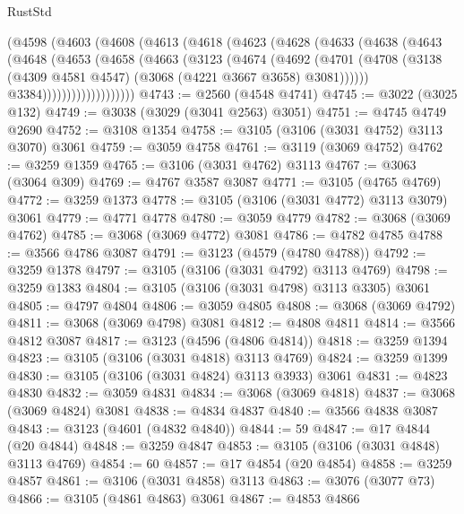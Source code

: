 \begin{lexlean}{RustStd}
\begin{coremodule}
            (@4598
              (@4603
                (@4608
                  (@4613
                    (@4618
                      (@4623
                        (@4628
                          (@4633
                            (@4638
                              (@4643
                                (@4648
                                  (@4653
                                    (@4658
                                      (@4663
                                        (@3123
                                          (@4674
                                            (@4692
                                              (@4701
                                                (@4708
                                                  (@3138
                                                    (@4309 @4581 @4547)
                                                    (@3068 (@4221 @3667 @3658) @3081))))))
                                          @3384)))))))))))))))))))
@4743 := @2560 (@4548 @4741)
@4745 := @3022 (@3025 @132)
@4749 := @3038 (@3029 (@3041 @2563) @3051)
@4751 := @4745 @4749 @2690
@4752 := @3108 @1354
@4758 := @3105 (@3106 (@3031 @4752) @3113 @3070) @3061
@4759 := @3059 @4758
@4761 := @3119 (@3069 @4752)
@4762 := @3259 @1359
@4765 := @3106 (@3031 @4762) @3113
@4767 := @3063 (@3064 @309)
@4769 := @4767 @3587 @3087
@4771 := @3105 (@4765 @4769)
@4772 := @3259 @1373
@4778 := @3105 (@3106 (@3031 @4772) @3113 @3079) @3061
@4779 := @4771 @4778
@4780 := @3059 @4779
@4782 := @3068 (@3069 @4762)
@4785 := @3068 (@3069 @4772) @3081
@4786 := @4782 @4785
@4788 := @3566 @4786 @3087
@4791 := @3123 (@4579 (@4780 @4788))
@4792 := @3259 @1378
@4797 := @3105 (@3106 (@3031 @4792) @3113 @4769)
@4798 := @3259 @1383
@4804 := @3105 (@3106 (@3031 @4798) @3113 @3305) @3061
@4805 := @4797 @4804
@4806 := @3059 @4805
@4808 := @3068 (@3069 @4792)
@4811 := @3068 (@3069 @4798) @3081
@4812 := @4808 @4811
@4814 := @3566 @4812 @3087
@4817 := @3123 (@4596 (@4806 @4814))
@4818 := @3259 @1394
@4823 := @3105 (@3106 (@3031 @4818) @3113 @4769)
@4824 := @3259 @1399
@4830 := @3105 (@3106 (@3031 @4824) @3113 @3933) @3061
@4831 := @4823 @4830
@4832 := @3059 @4831
@4834 := @3068 (@3069 @4818)
@4837 := @3068 (@3069 @4824) @3081
@4838 := @4834 @4837
@4840 := @3566 @4838 @3087
@4843 := @3123 (@4601 (@4832 @4840))
@4844 := 59
@4847 := @17 @4844 (@20 @4844)
@4848 := @3259 @4847
@4853 := @3105 (@3106 (@3031 @4848) @3113 @4769)
@4854 := 60
@4857 := @17 @4854 (@20 @4854)
@4858 := @3259 @4857
@4861 := @3106 (@3031 @4858) @3113
@4863 := @3076 (@3077 @73)
@4866 := @3105 (@4861 @4863) @3061
@4867 := @4853 @4866

\end{coremodule}
\end{lexlean}
